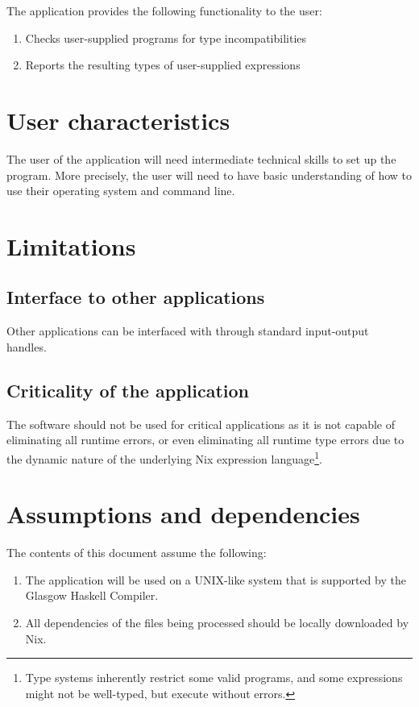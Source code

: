 \documentclass[12pt]{article}
\begin{document}
The application provides the following functionality to the user:

\begin{enumerate}
  \item Checks user-supplied programs for type incompatibilities
  \item Reports the resulting types of user-supplied expressions
\end{enumerate}

\section{User characteristics}

The user of the application will need intermediate technical skills to set up the program. More precisely, the user will need to have basic understanding of how to use their operating system and command line.

\section{Limitations}

\subsection{Interface to other applications}

Other applications can be interfaced with through standard input-output handles.

\subsection{Criticality of the application}

The software should not be used for critical applications as it is not capable of eliminating all runtime errors, or even eliminating all runtime type errors due to the dynamic nature of the underlying Nix expression language\footnote{Type systems inherently restrict some valid programs, and some expressions might not be well-typed, but execute without errors.}.

\section{Assumptions and dependencies}

The contents of this document assume the following:

\begin{enumerate}
  \item The application will be used on a UNIX-like system that is supported by the Glasgow Haskell Compiler.
  \item All dependencies of the files being processed should be locally downloaded by Nix.
\end{enumerate}
\end{document}
